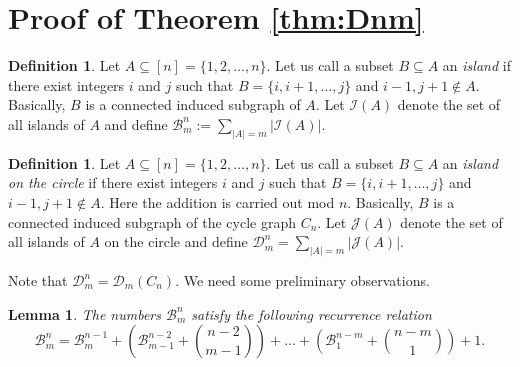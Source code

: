 \documentclass[10pt, reqno]{amsart}
\theoremstyle{plain}
\newtheorem{lemma}[theorem]{Lemma}
\theoremstyle{remark}
\def\D{\mathcal D}
\def\B{\mathcal B}
\theoremstyle{definition}
\newtheorem{defn}[theorem]{Definition}
\numberwithin{equation}{section}
\begin{document}
\section{Proof of Theorem \ref{thm:Dnm}}\label{cycle-app}
\begin{defn}
	Let $A\subseteq[n]=\{1, 2, \dots, n\}$. Let us call a subset $B\subseteq A$ an \textit{island} if there exist integers $i$ and $j$ such that $B=\{i, i+1, \dots ,j\}$ and $i-1, j+1\notin A$. Basically, $B$ is a connected induced subgraph of $A$. Let $\mathcal I(A)$ denote the set of all islands of $A$ and define $\B^n_m:=\sum_{|A|=m}|\mathcal I(A)|$.
\end{defn}
\begin{defn}
	Let $A\subseteq[n]=\{1, 2, \dots, n\}$. Let us call a subset $B\subseteq A$ an \textit{island on the circle} if there exist integers $i$ and $j$ such that $B=\{i, i+1, \dots ,j\}$ and $i-1, j+1\notin A$. Here the addition is carried out mod $n$. Basically, $B$ is a connected induced subgraph of the cycle graph $C_n$. Let $\mathcal J(A)$ denote the set of all islands of $A$ on the circle and define $\D^n_m=\sum_{|A|=m}|\mathcal J(A)|$.
\end{defn}
Note that $\mathcal{D}^n_m=\mathscr{D}_m(C_n)$. We need some preliminary observations.
\begin{lemma}
	The numbers $\B_m^n$ satisfy the following recurrence relation
	\begin{equation}
	\B_m^n=\B_{m}^{n-1}+\left(\B_{m-1}^{n-2}+{n-2 \choose m-1}\right)+\dots +\left(\B^{n-m}_1+{n-m \choose 1}\right)+1. 
	\label{eq1}
	\end{equation}
\end{lemma}
\end{document}
